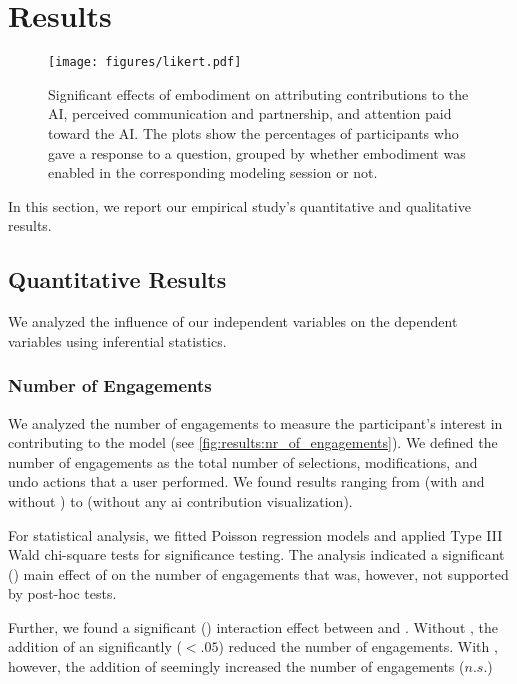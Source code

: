\section{Results}

\begin{figure*}
	\centering
    \texttt{[image: figures/likert.pdf]}	
	\caption{Significant effects of embodiment on attributing contributions to the AI, perceived communication and partnership, and attention paid toward the AI. The plots show the percentages of participants who gave a response to a question, grouped by whether embodiment was enabled in the corresponding modeling session or not.}
	\label{fig:embodiment-plots}
\end{figure*}

In this section, we report our empirical study's quantitative and qualitative results.

\subsection{Quantitative Results}

We analyzed the influence of our independent variables on the dependent variables using inferential statistics. 

\subsubsection{Number of Engagements}

We analyzed the number of engagements to measure the participant's interest in contributing to the model (see \autoref{fig:results:nr_of_engagements}). We defined the number of engagements as the total number of selections, modifications, and undo actions that a user performed. We found results ranging from  (with \ivHigh{} and \ivInc{} without \ivEmb{}) to  (without any ai contribution visualization).

For statistical analysis, we fitted Poisson
regression models and applied Type III Wald chi-square tests for significance testing. The analysis indicated a significant () main effect of \ivHigh{} on the number of engagements that was, however, not supported by post-hoc tests.

Further, we found a significant () interaction effect between \ivHigh{} and \ivInc{}. Without \ivHigh{}, the addition of an \ivInc{} significantly ($<.05$) reduced the number of engagements. With \ivHigh{}, however, the addition of \ivInc{} seemingly increased the number of engagements ($n.s.$)

